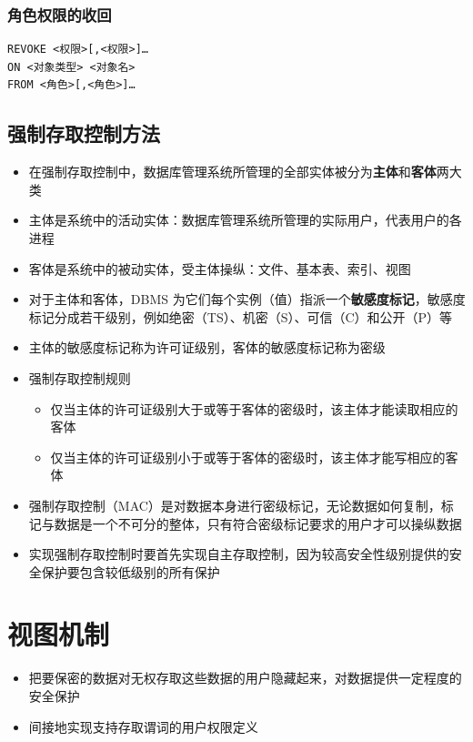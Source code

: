 \subsubsection{角色权限的收回}
\begin{lstlisting}
REVOKE <权限>[,<权限>]…
ON <对象类型> <对象名>
FROM <角色>[,<角色>]…
\end{lstlisting}

\subsection{强制存取控制方法}
\begin{itemize}
    \item 在强制存取控制中，数据库管理系统所管理的全部实体被分为\textbf{主体}和\textbf{客体}两大类
    \item  主体是系统中的活动实体：数据库管理系统所管理的实际用户，代表用户的各进程
    \item  客体是系统中的被动实体，受主体操纵：文件、基本表、索引、视图
    \item  对于主体和客体，DBMS 为它们每个实例（值）指派一个\textbf{敏感度标记}，敏感度标记分成若干级别，例如绝密（TS）、机密（S）、可信（C）和公开（P）等
    \item  主体的敏感度标记称为许可证级别，客体的敏感度标记称为密级
    \item  强制存取控制规则
    \begin{itemize}
        \item 仅当主体的许可证级别大于或等于客体的密级时，该主体才能读取相应的客体
        \item 仅当主体的许可证级别小于或等于客体的密级时，该主体才能写相应的客体
    \end{itemize}
    \item  强制存取控制（MAC）是对数据本身进行密级标记，无论数据如何复制，标记与数据是一个不可分的整体，只有符合密级标记要求的用户才可以操纵数据
    \item  实现强制存取控制时要首先实现自主存取控制，因为较高安全性级别提供的安全保护要包含较低级别的所有保护
\end{itemize}

\section{视图机制}
\begin{itemize}
    \item 把要保密的数据对无权存取这些数据的用户隐藏起来，对数据提供一定程度的安全保护 
    \item 间接地实现支持存取谓词的用户权限定义
\end{itemize}

